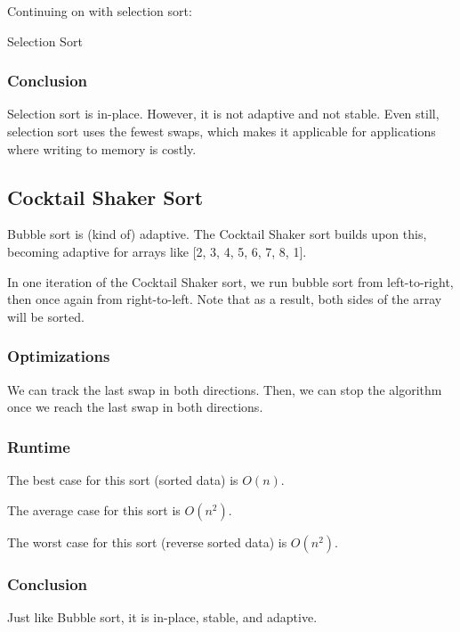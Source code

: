 
Continuing on with selection sort:

\begin{algorithm}[H]
	\caption{Selection Sort}
\end{algorithm}

\subsubsection{Conclusion}

Selection sort is in-place. However, it is not adaptive and not stable. Even still, selection sort uses the fewest swaps, which makes it applicable for applications where writing to memory is costly.

\subsection{Cocktail Shaker Sort}
Bubble sort is (kind of) adaptive. The Cocktail Shaker sort builds upon this, becoming adaptive for arrays like [2, 3, 4, 5, 6, 7, 8, 1].

In one iteration of the Cocktail Shaker sort, we run bubble sort from left-to-right, then once again from right-to-left. Note that as a result, both sides of the array will be sorted.

\subsubsection{Optimizations}
We can track the last swap in both directions. Then, we can stop the algorithm once we reach the last swap in both directions.

\subsubsection{Runtime}
The best case for this sort (sorted data) is \( O(n) \).

The average case for this sort is \( O(n^2) \).

The worst case for this sort (reverse sorted data) is \( O(n^2) \).

\subsubsection{Conclusion}
Just like Bubble sort, it is in-place, stable, and adaptive.

